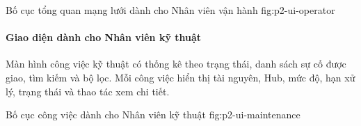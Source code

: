   {Bố cục tổng quan mạng lưới dành cho Nhân viên vận hành}
  {fig:p2-ui-operator}

\clearpage
\paragraph{Giao diện dành cho Nhân viên kỹ thuật}

Màn hình công việc kỹ thuật có thống kê theo trạng thái, danh sách sự cố được giao, tìm kiếm và bộ lọc. Mỗi công việc hiển thị tài nguyên, Hub, mức độ, hạn xử lý, trạng thái và thao tác xem chi tiết.

  {Bố cục công việc dành cho Nhân viên kỹ thuật}
  {fig:p2-ui-maintenance}
